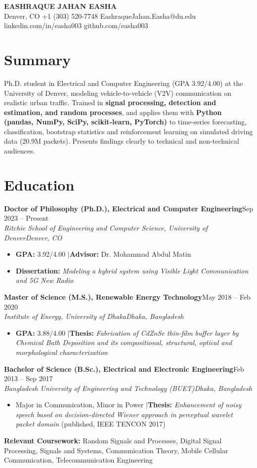 \documentclass[10pt,letterpaper]{article}
\newcommand{\entry}[4]{\textbf{#1}\hfill #2\\\textit{#3}\hfill\textit{#4}\par}
\begin{document}
\begin{center}{\LARGE\bfseries\color{accent} EASHRAQUE JAHAN EASHA}\\[3pt]
Denver, CO \textbar{} +1 (303) 520-7748 \textbar{} EashraqueJahan.Easha@du.edu \textbar{} linkedin.com/in/easha003 \textbar{} github.com/easha003\end{center}\vspace{-6pt}
\section*{Summary}
Ph.D. student in Electrical and Computer Engineering (GPA 3.92/4.00) at the University of Denver, modeling vehicle-to-vehicle (V2V) communication on realistic urban traffic. Trained in \textbf{signal processing, detection and estimation, and random processes}, and applies them with \textbf{Python (pandas, NumPy, SciPy, scikit-learn, PyTorch)} to time-series forecasting, classification, bootstrap statistics and reinforcement learning on simulated driving data (20.9M packets). Presents findings clearly to technical and non-technical audiences.
\section*{Education}
\entry{Doctor of Philosophy (Ph.D.), Electrical and Computer Engineering}{Sep 2023 – Present}{Ritchie School of Engineering and Computer Science, University of Denver}{Denver, CO}
\begin{itemize}\item \textbf{GPA:} 3.92/4.00 \quad|\quad \textbf{Advisor:} Dr. Mohammad Abdul Matin\item \textbf{Dissertation:} \textit{Modeling a hybrid system using Visible Light Communication and 5G New Radio}\end{itemize}
\vspace{2pt}
\entry{Master of Science (M.S.), Renewable Energy Technology}{May 2018 – Feb 2020}{Institute of Energy, University of Dhaka}{Dhaka, Bangladesh}
\begin{itemize}\item \textbf{GPA:} 3.88/4.00 \quad|\quad \textbf{Thesis:} \textit{Fabrication of CdZnSe thin-film buffer layer by Chemical Bath Deposition and its compositional, structural, optical and morphological characterization}\end{itemize}
\vspace{2pt}
\entry{Bachelor of Science (B.Sc.), Electrical and Electronic Engineering}{Feb 2013 – Sep 2017}{Bangladesh University of Engineering and Technology (BUET)}{Dhaka, Bangladesh}
\begin{itemize}\item Major in Communication, Minor in Power \quad|\quad \textbf{Thesis:} \textit{Enhancement of noisy speech based on decision-directed Wiener approach in perceptual wavelet packet domain} (published, IEEE TENCON 2017)\end{itemize}
\vspace{2pt}
\textbf{Relevant Coursework:} Random Signals and Processes, Digital Signal Processing, Signals and Systems, Communication Theory, Mobile Cellular Communication, Telecommunication Engineering
\end{document}
